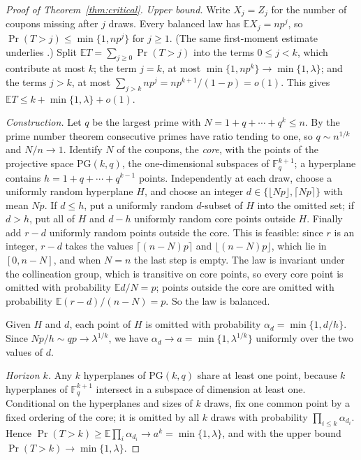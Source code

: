 \documentclass[11pt,a4paper]{article}
\theoremstyle{remark}
\newcommand{\E}{\mathbb E}
\begin{document}
\begin{proof}[Proof of Theorem~\ref{thm:critical}]
\emph{Upper bound.} Write $X_j=Z_j$ for the number of coupons missing after $j$ draws. Every balanced law has $\E X_j=np^j$, so $\Pr(T>j)\le\min\{1,np^j\}$ for $j\ge1$. (The same first-moment estimate underlies \cite[Theorem~10]{gy}.) Split $\E T=\sum_{j\ge0}\Pr(T>j)$ into the terms $0\le j<k$, which contribute at most $k$; the term $j=k$, at most $\min\{1,np^k\}\to\min\{1,\lambda\}$; and the terms $j>k$, at most $\sum_{j>k}np^j=np^{k+1}/(1-p)=o(1)$. This gives $\E T\le k+\min\{1,\lambda\}+o(1)$.

\emph{Construction.} Let $q$ be the largest prime with $N=1+q+\cdots+q^k\le n$. By the prime number theorem consecutive primes have ratio tending to one, so $q\sim n^{1/k}$ and $N/n\to1$. Identify $N$ of the coupons, the \emph{core}, with the points of the projective space $\mathrm{PG}(k,q)$, the one-dimensional subspaces of $\mathbb F_q^{k+1}$; a hyperplane contains $h=1+q+\cdots+q^{k-1}$ points. Independently at each draw, choose a uniformly random hyperplane $H$, and choose an integer $d\in\{\lfloor Np\rfloor,\lceil Np\rceil\}$ with mean $Np$. If $d\le h$, put a uniformly random $d$-subset of $H$ into the omitted set; if $d>h$, put all of $H$ and $d-h$ uniformly random core points outside $H$. Finally add $r-d$ uniformly random points outside the core. This is feasible: since $r$ is an integer, $r-d$ takes the values $\lceil(n-N)p\rceil$ and $\lfloor(n-N)p\rfloor$, which lie in $[0,n-N]$, and when $N=n$ the last step is empty. The law is invariant under the collineation group, which is transitive on core points, so every core point is omitted with probability $\E d/N=p$; points outside the core are omitted with probability $\E(r-d)/(n-N)=p$. So the law is balanced.

Given $H$ and $d$, each point of $H$ is omitted with probability $\alpha_d=\min\{1,d/h\}$. Since $Np/h\sim qp\to\lambda^{1/k}$, we have $\alpha_d\to a=\min\{1,\lambda^{1/k}\}$ uniformly over the two values of $d$.

\emph{Horizon $k$.} Any $k$ hyperplanes of $\mathrm{PG}(k,q)$ share at least one point, because $k$ hyperplanes of $\mathbb F_q^{k+1}$ intersect in a subspace of dimension at least one. Conditional on the hyperplanes and sizes of $k$ draws, fix one common point by a fixed ordering of the core; it is omitted by all $k$ draws with probability $\prod_{i\le k}\alpha_{d_i}$. Hence $\Pr(T>k)\ge\E\prod_i\alpha_{d_i}\to a^k=\min\{1,\lambda\}$, and with the upper bound $\Pr(T>k)\to\min\{1,\lambda\}$.


\end{proof}
\end{document}

